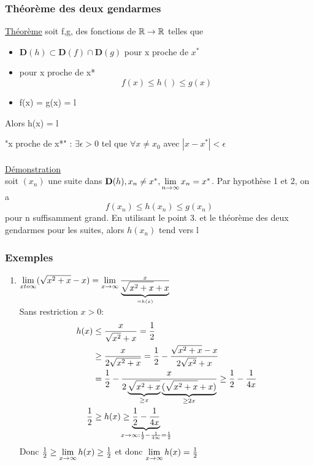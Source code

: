 \documentclass[12pt,a4paper]{article}
\begin{document}
{\subsubsection{Théorème des deux gendarmes}
\begin{boite}
\underline{Théorème} soit f,g, des fonctions de $\mathbb{R} \to \mathbb{R}$ telles que 
\begin{itemize}
\item $\mathbf{D}(h) \subset \mathbf{D}(f) \cap \mathbf{D}(g)$ pour x proche de $x^*$
\item pour x proche de x* 
\begin{equation}
f(x) \leq h() \leq g(x)
\end{equation}
\item f(x) = g(x) = l 
\end{itemize}
Alors h(x) = l
\end{boite}
"x proche de x*" : $\exists \epsilon > 0$ tel que $\forall x \neq x_0$ avec $|x -x^*| < \epsilon$\\
\\
\underline{Démonstration}\\
soit $(x_n)$ une suite dans $\mathbf{D}(h),x_n \neq x^*, \lim\limits_{n \to \infty} x_n = x^*$. Par hypothèse 1 et 2, on a 
\begin{equation}
f(x_n) \leq h(x_n) \leq g(x_n)
\end{equation}
pour n suffisamment grand. En utilisant le point 3. et le théorème des deux gendarmes pour les suites, alors $h(x_n)$ tend vers l
\subsubsection{Exemples}
\begin{enumerate}
\item $\lim\limits_{x to \infty} (\sqrt{x^2+x}-x) = \lim\limits_{x \to \infty} \frac{x}{\underbrace{\sqrt{x^2+x}+x}_{= h(x)}}$ \\
Sans restriction $x > 0 :$\begin{align*}
h(x) &\leq \frac{x}{\sqrt{x^2}+x} = \frac{1}{2}\\
& \geq \frac{x}{2\sqrt{x^2+x}}=\frac{1}{2} - \frac{\sqrt{x^2+x}-x}{2\sqrt{x^2}+x}\\
& = \frac{1}{2}- \frac{x}{2\underbrace{\sqrt{x^2+x}}_{\geq x}\underbrace{(\sqrt{x^2+x} +x)}_{\geq 2x}} \geq \frac{1}{2}-\frac{1}{4x}\\
\frac{1}{2}&\geq h(x) \geq \underbrace{\frac{1}{2}-\frac{1}{4x}}_{\mathclap{x\to \infty : \frac{1}{2}-\frac{1}{4\infty}= \frac{1}{2}}}
\end{align*} 
Donc $\frac{1}{2} \geq \lim\limits_{x \to \infty} h(x) \geq \frac{1}{2}$ et donc $\lim\limits_{x\to\infty} h(x) = \frac{1}{2}$


\end{enumerate}}
\end{document}
